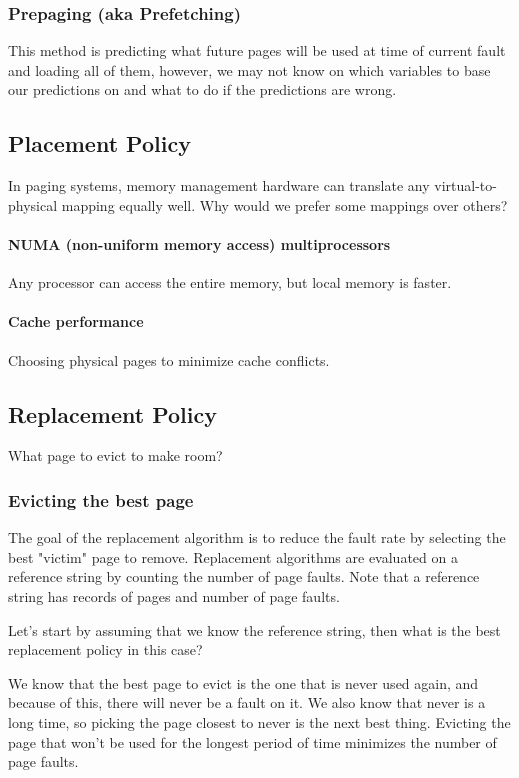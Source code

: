 \documentclass{article}
\begin{document}
\subsubsection{Prepaging (aka Prefetching)}

This method is predicting what future pages will be used at time of current fault and loading all of them, however, we may not know on which variables to base our predictions on and what to do if the predictions are wrong.

\subsection{Placement Policy}
In paging systems, memory management hardware can translate any virtual-to-physical mapping equally well. Why would we prefer some mappings over others?
\paragraph{NUMA (non-uniform memory access) multiprocessors} Any processor can access the entire memory, but local memory is faster.

\paragraph{Cache performance} Choosing physical pages to minimize cache conflicts.

\subsection{Replacement Policy}
What page to evict to make room?
\subsubsection{Evicting the best page}

The goal of the replacement algorithm is to reduce the fault rate by selecting the best "victim" page to remove. Replacement algorithms are evaluated on a reference string by counting the number of page faults. Note that a reference string has records of pages and number of page faults.

Let's start by assuming that we know the reference string, then what is the best replacement policy in this case?

We know that the best page to evict is the one that is never used again, and because of this, there will never be a fault on it. We also know that never is a long time, so picking the page closest to never is the next best thing. Evicting the page that won't be used for the longest period of time minimizes the number of page faults.
\end{document}
